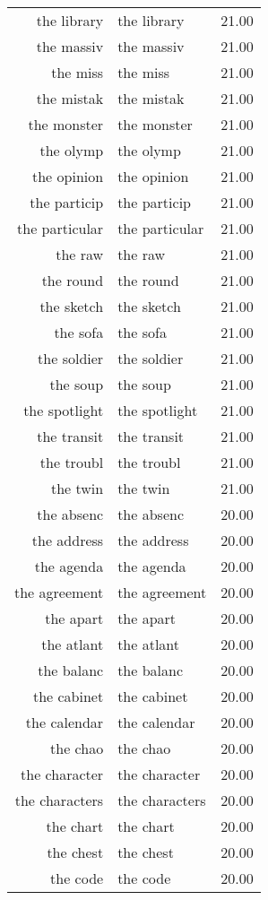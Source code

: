 \begin{table}[ht]
\begin{tabular}{rlr}
  the library & the library & 21.00 \\ 
  the massiv & the massiv & 21.00 \\ 
  the miss & the miss & 21.00 \\ 
  the mistak & the mistak & 21.00 \\ 
  the monster & the monster & 21.00 \\ 
  the olymp & the olymp & 21.00 \\ 
  the opinion & the opinion & 21.00 \\ 
  the particip & the particip & 21.00 \\ 
  the particular & the particular & 21.00 \\ 
  the raw & the raw & 21.00 \\ 
  the round & the round & 21.00 \\ 
  the sketch & the sketch & 21.00 \\ 
  the sofa & the sofa & 21.00 \\ 
  the soldier & the soldier & 21.00 \\ 
  the soup & the soup & 21.00 \\ 
  the spotlight & the spotlight & 21.00 \\ 
  the transit & the transit & 21.00 \\ 
  the troubl & the troubl & 21.00 \\ 
  the twin & the twin & 21.00 \\ 
  the absenc & the absenc & 20.00 \\ 
  the address & the address & 20.00 \\ 
  the agenda & the agenda & 20.00 \\ 
  the agreement & the agreement & 20.00 \\ 
  the apart & the apart & 20.00 \\ 
  the atlant & the atlant & 20.00 \\ 
  the balanc & the balanc & 20.00 \\ 
  the cabinet & the cabinet & 20.00 \\ 
  the calendar & the calendar & 20.00 \\ 
  the chao & the chao & 20.00 \\ 
  the character & the character & 20.00 \\ 
  the characters & the characters & 20.00 \\ 
  the chart & the chart & 20.00 \\ 
  the chest & the chest & 20.00 \\ 
  the code & the code & 20.00 \\ 

\end{tabular}
\end{table}

